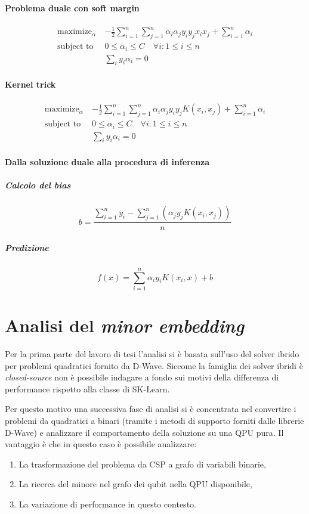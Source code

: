 \documentclass[12pt]{article}
\begin{document}
\paragraph{Problema duale con soft margin}

\begin{align*}
  \text{maximize}_\alpha\ & -\frac{1}{2}\sum_{i=1}^n\sum_{j=1}^n\alpha_i\alpha_jy_iy_jx_ix_j + \sum_{i=1}^n
\alpha_i \\
  \text{subject to } & 0 \leq \alpha_i \leq C \quad \forall i: 1\leq i\leq n \\
  & \sum_iy_i\alpha_i=0
\end{align*}

\paragraph{Kernel trick}

\begin{align*}
  \text{maximize}_\alpha\ & -\frac{1}{2}\sum_{i=1}^n\sum_{j=1}^n\alpha_i\alpha_jy_iy_jK(x_i, x_j) + \sum_{i=1}^n
\alpha_i \\
  \text{subject to } & 0 \leq \alpha_i \leq C \quad \forall i: 1\leq i\leq n \\
  & \sum_iy_i\alpha_i=0
\end{align*}

\paragraph{Dalla soluzione duale alla procedura di inferenza}

\subparagraph{Calcolo del bias}

$$b = \frac{\sum_{i=1}^n y_i - \sum_{j=1}^n(\alpha_jy_jK(x_i,x_j))}{n}$$

\subparagraph{Predizione}

$$f(x)=\sum_{i=1}^n\alpha_iy_iK(x_i, x) + b$$

\section{Analisi del \emph{minor embedding}}

Per la prima parte del lavoro di tesi l'analisi si è basata sull'uso del solver ibrido per problemi quadratici fornito da D-Wave.
Siccome la famiglia dei solver ibridi è \emph{closed-source} non è possibile indagare a fondo sui motivi della differenza di performance rispetto alla classe di SK-Learn.

Per questo motivo una successiva fase di analisi si è concentrata nel convertire i problemi da quadratici a binari (tramite i metodi di supporto forniti dalle librerie D-Wave) e analizzare il comportamento della soluzione su una QPU pura.
Il vantaggio è che in questo caso è possibile analizzare:
\begin{enumerate}
  \item La trasformazione del problema da CSP a grafo di variabili binarie,
  \item La ricerca del minore nel grafo dei qubit nella QPU disponibile,
  \item La variazione di performance in questo contesto.
\end{enumerate}
\end{document}
